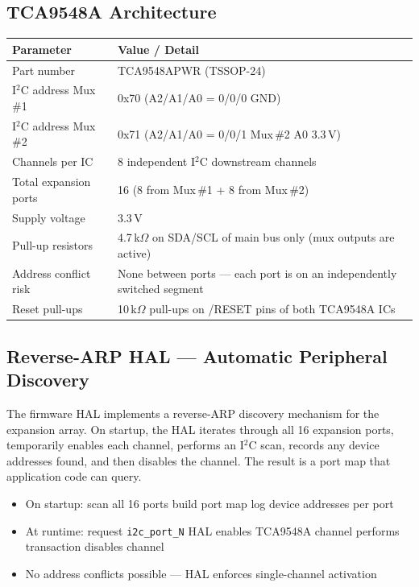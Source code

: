 \documentclass[11pt,a4paper]{article}
\begin{document}
\subsection{TCA9548A Architecture}

\begin{longtable}{p{5cm} p{10cm}}
  \toprule
  \rowcolor{headergray}\color{white}\textbf{Parameter} & \color{white}\textbf{Value / Detail} \\
  \midrule\endhead
  Part number & TCA9548APWR (TSSOP-24) \\
  I$^2$C address Mux\,\#1 & 0x70 (A2/A1/A0 = 0/0/0 \textrightarrow{} GND) \\
  I$^2$C address Mux\,\#2 & 0x71 (A2/A1/A0 = 0/0/1 \textrightarrow{} Mux\,\#2 A0 \textrightarrow{} 3.3\,V) \\
  Channels per IC & 8 independent I$^2$C downstream channels \\
  Total expansion ports & 16 (8 from Mux\,\#1 + 8 from Mux\,\#2) \\
  Supply voltage & 3.3\,V \\
  Pull-up resistors & 4.7\,k$\Omega$ on SDA/SCL of main bus only (mux outputs are active) \\
  Address conflict risk & None between ports --- each port is on an independently switched segment \\
  Reset pull-ups & 10\,k$\Omega$ pull-ups on /RESET pins of both TCA9548A ICs \\
  \bottomrule
\end{longtable}

\subsection{Reverse-ARP HAL --- Automatic Peripheral Discovery}

The firmware HAL implements a reverse-ARP discovery mechanism for the expansion array. On startup, the HAL iterates through all 16 expansion ports, temporarily enables each channel, performs an I$^2$C scan, records any device addresses found, and then disables the channel. The result is a port map that application code can query.

\begin{itemize}
  \item On startup: scan all 16 ports \textrightarrow{} build port map \textrightarrow{} log device addresses per port
  \item At runtime: request \texttt{i2c\_port\_N} \textrightarrow{} HAL enables TCA9548A channel \textrightarrow{} performs transaction \textrightarrow{} disables channel
  \item No address conflicts possible --- HAL enforces single-channel activation
\end{itemize}
\end{document}
